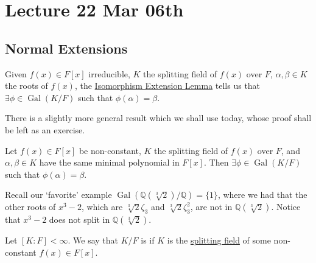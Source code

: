 \documentclass[notoc,notitlepage]{tufte-book}
\DeclareMathOperator{\Gal}{Gal}
\begin{document}


\chapter{Lecture 22 Mar 06th}%
\label{chp:lecture_22_mar_06th}

\section{Normal Extensions}%
\label{sec:normal_extensions}

\begin{note}
  Given $f(x) \in F[x]$ irreducible, $K$ the splitting field of $f(x)$ over $F$,
  $\alpha, \beta \in K$ the roots of $f(x)$, the
  \hyperref[lemma:isomorphism_extension_lemma]{Isomorphism Extension Lemma}
  tells us that $\exists \phi \in \Gal(K / F)$ such that $\phi(\alpha) = \beta$.
\end{note}

There is a slightly more general result which we shall use today, whose proof
shall be left as an exercise.

\begin{ex}\label{ex:galois_permutations_work_even_with_reducible_polyms}
  Let $f(x) \in F[x]$ be non-constant, $K$ the splitting field of $f(x)$ over
  $F$, and $\alpha, \beta \in K$ have the same minimal polynomial in $F[x]$.
  Then $\exists \phi \in \Gal(K / F)$ such that $\phi(\alpha) = \beta$.
\end{ex}

\begin{eg}
  Recall our `favorite' example $\Gal( \mathbb{Q}(\sqrt[3]{2}) / \mathbb{Q} ) =
  \{ 1 \}$, where we had that the other roots of $x^3 - 2$, which are
  $\sqrt[3]{2} \zeta_3$ and $\sqrt[3]{2} \zeta_3^2$, are not in
  $\mathbb{Q}(\sqrt[3]{2})$. Notice that $x^3 - 2$ does not split in
  $\mathbb{Q}(\sqrt[3]{2})$.
\end{eg}

\begin{defn}\label{defn:normal_extension}
  Let $[ K : F ] < \infty$. We say that $K / F$ is  if $K$ is
  the \hyperref[defn:splitting_field]{splitting field} of some non-constant
  $f(x) \in F[x]$.
\end{defn}
\end{document}
